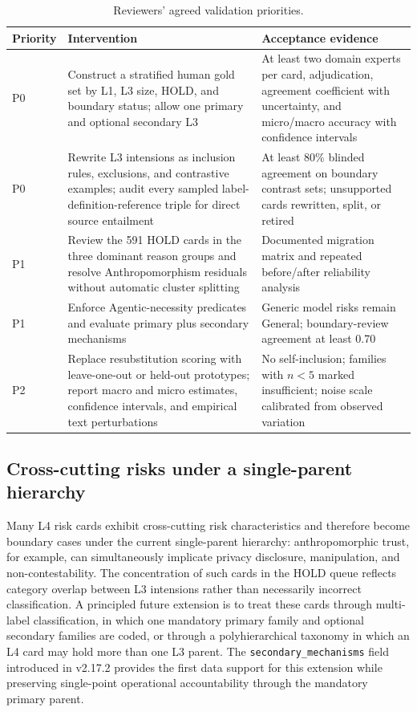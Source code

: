 \documentclass[11pt,a4paper]{article}
\newcommand{\code}[1]{\texttt{#1}}
\begin{document}
\begin{table}[H]
\centering
\caption{Reviewers' agreed validation priorities.}
\small
\begin{tabularx}{\textwidth}{p{1.0cm} X X}
\toprule
Priority & Intervention & Acceptance evidence \\
\midrule
P0 & Construct a stratified human gold set by L1, L3 size, HOLD, and boundary
status; allow one primary and optional secondary L3 & At least two domain
experts per card, adjudication, agreement coefficient with uncertainty, and
micro/macro accuracy with confidence intervals \\
P0 & Rewrite L3 intensions as inclusion rules, exclusions, and contrastive
examples; audit every sampled label-definition-reference triple for direct
source entailment & At least 80\% blinded agreement on boundary contrast sets;
unsupported cards rewritten, split, or retired \\
P1 & Review the 591 HOLD cards in the three dominant reason groups and resolve
Anthropomorphism residuals without automatic cluster splitting & Documented
migration matrix and repeated before/after reliability analysis \\
P1 & Enforce Agentic-necessity predicates and evaluate primary plus secondary
mechanisms & Generic model risks remain General; boundary-review agreement at
least 0.70 \\
P2 & Replace resubstitution scoring with leave-one-out or held-out prototypes;
report macro and micro estimates, confidence intervals, and empirical text
perturbations & No self-inclusion; families with $n<5$ marked insufficient;
noise scale calibrated from observed variation \\
\bottomrule
\end{tabularx}
\end{table}


\subsection{Cross-cutting risks under a single-parent hierarchy}

Many L4 risk cards exhibit cross-cutting risk characteristics and therefore
become boundary cases under the current single-parent hierarchy:
anthropomorphic trust, for example, can simultaneously implicate privacy
disclosure, manipulation, and non-contestability. The concentration of such
cards in the HOLD queue reflects category overlap between L3 intensions
rather than necessarily incorrect classification. A principled future
extension is to treat these cards through multi-label classification, in
which one mandatory primary family and optional secondary families are coded,
or through a polyhierarchical taxonomy in which an L4 card may hold more than
one L3 parent. The \code{secondary\_mechanisms} field introduced in v2.17.2
provides the first data support for this extension while preserving
single-point operational accountability through the mandatory primary parent.
\end{document}

